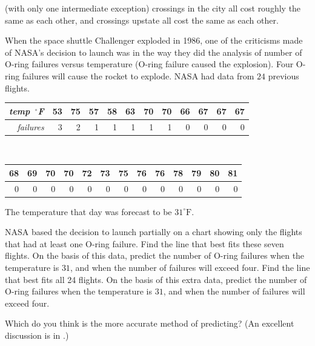 \begin{exercises}
\begin{answer}
      (with only one intermediate exception) crossings in the city
      all cost roughly the same as each other,
      and crossings upstate all cost the same as each other.
    \end{answer}
  \item 
    When the space shuttle Challenger exploded in 1986, one of the
    criticisms made of NASA's decision to launch was in the way they did the
    analysis of number of O-ring failures versus temperature
    (O-ring failure caused the explosion).
    Four O-ring failures will cause the rocket to explode.
    NASA had data from $24$ previous flights.
    \begin{center}
      \begin{tabular}{r|rrrrrrrrrrr}
         \textit{temp\ ${}^\circ$F} 
            &53 &75 &57 &58 &63 &70 &70 &66 &67 &67 &67 \\
         \hline
         \textit{failures}  
            &3  &2  &1  &1  &1  &1  &1  &0  &0  &0  &0
      \end{tabular}\hspace*{3em}                                           \\
      \hspace*{3em}\begin{tabular}{|rrrrrrrrrrrrr}
                68 &69 &70 &70 &72 &73 &75 &76 &76 &78 &79 &80 &81\\
         \hline
                0  &0  &0  &0  &0  &0  &0  &0  &0  &0  &0  &0  &0
      \end{tabular}
    \end{center}
    The temperature that day was forecast to be \( 31^\circ\text{F} \).
    \begin{exparts}
      \partsitem NASA based the decision to launch partially on a chart showing
        only the flights that had at least one O-ring failure.
        Find the line that best fits these seven flights.
        On the basis of this data,
        predict the number of O-ring failures when the temperature is $31$, and
        when the number of failures will exceed four.
      \partsitem Find the line that best fits all 24 flights.
        On the basis of this extra data,
        predict the number of O-ring failures when the temperature is $31$, and
        when the number of failures will exceed four.
    \end{exparts}
    Which do you think is the more accurate method of predicting?
    (An excellent discussion is in \cite{Stats}.)
    \begin{answer}

\end{answer}
\end{exercises}
